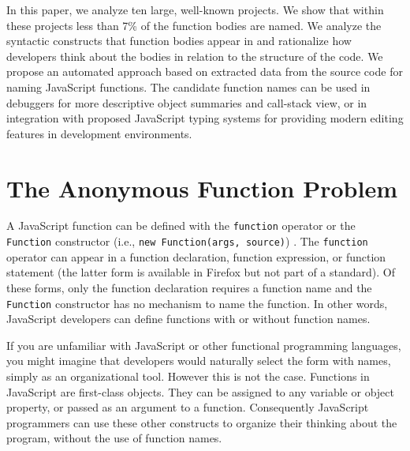 \documentclass[10pt, preprint]{sigplanconf}
\begin{document}
In this paper, we analyze ten large, well-known projects. We show that within these projects less than 7\% of the function bodies are named. 
We analyze the syntactic constructs that function bodies appear in and rationalize how developers think about the bodies in relation to the structure of the code.
We propose an automated approach based on extracted data from the source code for naming JavaScript functions. The candidate function names can be used in debuggers for more descriptive object summaries and call-stack view, or in integration with proposed JavaScript typing systems for providing modern editing features in development environments. 





\section{The Anonymous Function Problem}

A JavaScript function can be defined with the {\small\texttt{function}} operator or the {\small\texttt{Function}} constructor (i.e., {\small\texttt{new Function(args, source)}}) \cite{ECMA}. The {\small\texttt{function}} operator can appear in a function declaration, function expression, or function statement (the latter form is available in Firefox but not part of a standard).  Of these forms, only the function declaration requires a function name and the {\small\texttt{Function}} constructor has no mechanism to name the function.  In other words, JavaScript developers can define functions with or without function names.

If you are unfamiliar with JavaScript or other functional programming languages, you might imagine that developers would naturally select the form with names, simply as an organizational tool. However this is not the case. Functions in JavaScript are first-class objects. They can be assigned to any variable or object property, or passed as an argument to a function. Consequently JavaScript programmers can use these other constructs to organize their thinking about the program, without the use of function names.
\end{document}
